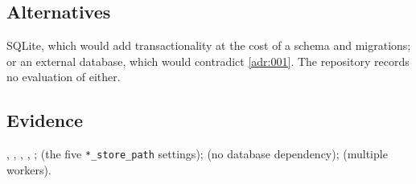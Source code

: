 \subsection*{Alternatives}

SQLite, which would add transactionality at the cost of a schema and
migrations; or an external database, which would contradict \cref{adr:001}.
The repository records no evaluation of either.

\noevidence

\subsection*{Evidence}

, ,
, ,
;
 (the five
\texttt{*\_store\_path} settings);  (no database
dependency);  (multiple workers).
